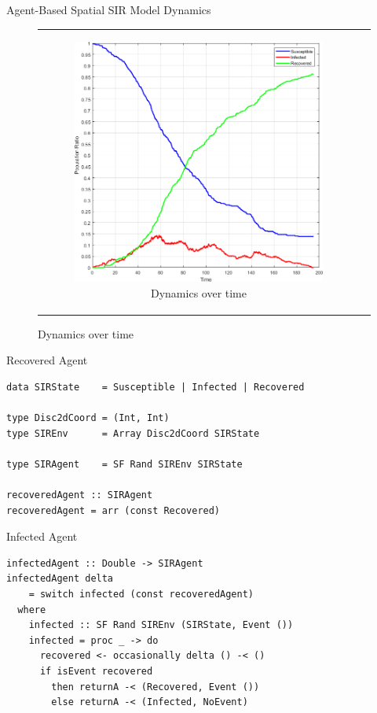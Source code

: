 \documentclass{beamer} %
\begin{document}
\begin{frame}{Agent-Based Spatial SIR Model Dynamics}
\begin{figure}
\begin{center}
\begin{tabular}{c c}
		\begin{subfigure}[b]{0.43\textwidth}
			\centering
			\includegraphics[width=1\textwidth, angle=0]{./fig/SIR_Dunai_dt001.png}
			\caption{Dynamics over time}
			\label{fig:sir_dunai_env_dynamics}
		\end{subfigure}
	\end{tabular}
\end{center}
\end{figure}
\end{frame}

\begin{frame}[fragile]{Recovered Agent}
\begin{block}{}
\begin{verbatim}
data SIRState    = Susceptible | Infected | Recovered

type Disc2dCoord = (Int, Int)
type SIREnv      = Array Disc2dCoord SIRState

type SIRAgent    = SF Rand SIREnv SIRState

recoveredAgent :: SIRAgent
recoveredAgent = arr (const Recovered) 
\end{verbatim}
\end{block}
\end{frame}

\begin{frame}[fragile]{Infected Agent}
\begin{block}{}
\begin{verbatim}
infectedAgent :: Double -> SIRAgent
infectedAgent delta
    = switch infected (const recoveredAgent)
  where
    infected :: SF Rand SIREnv (SIRState, Event ())
    infected = proc _ -> do
      recovered <- occasionally delta () -< ()
      if isEvent recovered
        then returnA -< (Recovered, Event ())
        else returnA -< (Infected, NoEvent)
\end{verbatim}
\end{block}
\end{frame}
\end{document}
